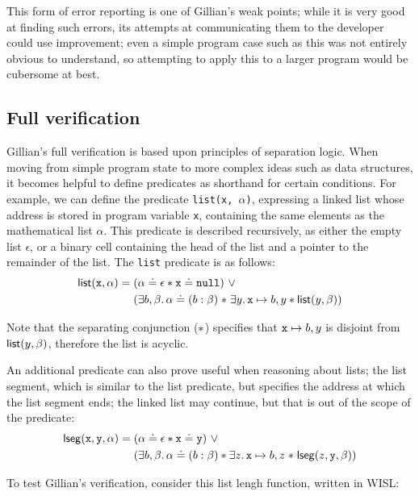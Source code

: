 This form of error reporting is one of Gillian's weak points; while it is very
good at finding such errors, its attempts at communicating them to the
developer could use improvement; even a simple program case such as this was
not entirely obvious to understand, so attempting to apply this to a larger
program would be cubersome at best.

\subsection{Full verification}

Gillian's full verification is based upon principles of separation logic. When
moving from simple program state to more complex ideas such as data structures,
it becomes helpful to define predicates as shorthand for certain conditions.
For example, we can define the predicate \texttt{list(x, $\alpha$)}, expressing
a linked list whose address is stored in program variable \texttt{x},
containing the same elements as the mathematical list $\alpha$. This predicate
is described recursively, as either the empty list $\epsilon$, or a binary cell
containing the head of the list and a pointer to the remainder of the list. The
\texttt{list} predicate is as follows:
\begin{align*}
  \mathsf{list}(\mathtt{x}, \alpha) =\; &(\alpha \doteq \epsilon \ast \mathtt{x} \doteq \mathtt{null})~\lor\\
  & (\exists b, \beta \ldotp \alpha \doteq (b : \beta) \mathrel{*} \exists y \ldotp \mathtt{x} \mapsto b, y \ast \mathsf{list}(y, \beta))
\end{align*}

Note that the separating conjunction ($\mathrel{*}$) specifies that
$\mathtt{x} \mapsto b, y$ is disjoint from $\mathsf{list}(y, \beta)$, therefore the
list is acyclic.

An additional predicate can also prove useful when reasoning about lists; the
list segment, which is similar to the list predicate, but specifies the address
at which the list segment ends; the linked list may continue, but that is out
of the scope of the predicate:
\begin{align*}
  \mathsf{lseg}(\mathtt{x}, \mathtt{y}, \alpha) =\; &(\alpha \doteq \epsilon \ast \mathtt{x} \doteq \mathtt{y})~\lor\\
  &(\exists b, \beta \ldotp \alpha \doteq (b : \beta) \ast \exists z \ldotp \mathtt{x} \mapsto b, z \mathrel{*} \mathsf{lseg}(z, \mathtt{y}, \beta))
\end{align*}

To test Gillian's verification, consider this list lengh function, written in WISL:

